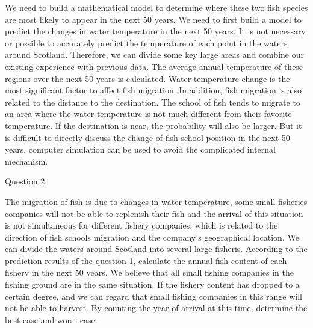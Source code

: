 \documentclass{mcmthesis}
\numberwithin{figure}{section}
\numberwithin{table}{section}
\begin{document}
We need to build a mathematical model to determine where these two fish species are most likely to appear in the next 50 years. We need to first build a model to predict the changes in water temperature in the next 50 years. It is not necessary or possible to accurately predict the temperature of each point in the waters around Scotland. Therefore, we can divide some key large areas and combine our existing experience with previous data. The average annual temperature of these regions over the next 50 years is calculated. Water temperature change is the most significant factor to affect fish migration. In addition, fish migration is also related to the distance to the destination. The school of fish tends to migrate to an area where the water temperature is not much different from their favorite temperature. If the destination is near, the probability will also be larger. But it is difficult to directly discuss the change of fish school position in the next 50 years, computer simulation can be used to avoid the complicated internal mechanism. \cite{REF4}

Question 2:

The migration of fish is due to changes in water temperature, some small fisheries companies will not be able to replenish their fish and the arrival of this situation is not simultaneous for different fishery companies, which is related to the direction of fish schools migration and the company's geographical location. We can divide the waters around Scotland into several large fisheris. According to the prediction results of the question 1, calculate the annual fish content of each fishery in the next 50 years. We believe that all small fishing companies in the fishing ground are in the same situation. If the fishery content has dropped to a certain degree, and we can regard that small fishing companies in this range will not be able to harvest. By counting the year of arrival at this time, determine the best case and worst case.
\end{document}

